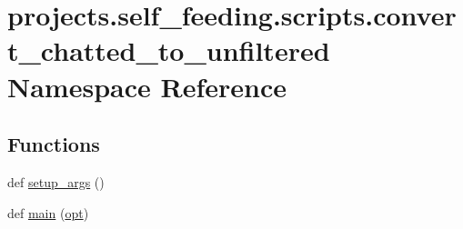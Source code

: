 \hypertarget{namespaceprojects_1_1self__feeding_1_1scripts_1_1convert__chatted__to__unfiltered}{}\section{projects.\+self\+\_\+feeding.\+scripts.\+convert\+\_\+chatted\+\_\+to\+\_\+unfiltered Namespace Reference}
\label{namespaceprojects_1_1self__feeding_1_1scripts_1_1convert__chatted__to__unfiltered}
\subsection*{Functions}
\begin{DoxyCompactItemize}
\item 
def \hyperlink{namespaceprojects_1_1self__feeding_1_1scripts_1_1convert__chatted__to__unfiltered_a0c8516f372e45778279d5e8dd120d508}{setup\+\_\+args} ()
\item 
def \hyperlink{namespaceprojects_1_1self__feeding_1_1scripts_1_1convert__chatted__to__unfiltered_a1fc60d6ff016ace4fb6d348542ae6e86}{main} (\hyperlink{namespaceprojects_1_1self__feeding_1_1scripts_1_1convert__chatted__to__unfiltered_a79f2c604bf608ef0b01f09323ffdddf3}{opt})
\end{DoxyCompactItemize}
